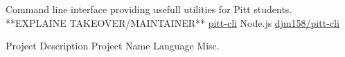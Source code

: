 
\vspace{-1mm}
\begin{cventries}

  \cventrywork
    {Command line interface providing usefull utilities for Pitt students. **EXPLAINE TAKEOVER/MAINTAINER**} %
    {\href{https://www.npmjs.com/package/pitt-cli}{pitt-cli}} %
    {Node.js} %
    {\href{https://github.com/djm158/pitt-cli}{\faGithub \hspace{0.5mm} djm158/pitt-cli}} %

  \vspace{1mm}

  \cventrywork
    {Project Description} %
    {Project Name} %
    {Language} %
    {Misc.} %
    
  \vspace{-5mm}

\end{cventries}

